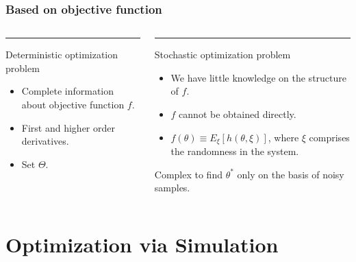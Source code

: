 \begin{frame}
\frametitle{\centering Based on  objective function}
\begin{small}
\begin{columns}[T]
\begin{column}{.48\textwidth}
\color{red}\rule{\linewidth}{4pt}
Deterministic optimization problem
\begin{itemize}
\item Complete information about objective function $f$.
\item First and higher order derivatives.
\item Set $\Theta$.
\end{itemize}
\end{column}
\pause
\begin{column}{.48\textwidth}
\color{blue}\rule{\linewidth}{4pt}
Stochastic optimization problem
\begin{itemize}
\item We have little knowledge on the structure of $f$.
\item $f$ cannot be obtained directly.
\item $f(\theta) \equiv E_{\xi}[h(\theta,\xi)]$, where $\xi$ comprises the randomness in the system.
\end{itemize}
Complex  to find $\theta^{*}$ only on the basis of noisy samples.
\end{column}
\end{columns}
\end{small}
\end{frame}


\section{Optimization via Simulation}

